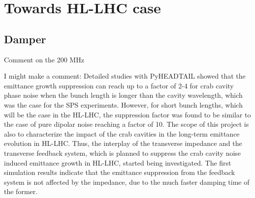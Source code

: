 \section{Towards HL-LHC case}
\subsection{Damper}
Comment on the 200 MHz

I might make a comment:
Detailed studies with PyHEADTAIL showed that the emittance growth suppression can reach up to a factor of 2-4 for crab cavity phase noise when the bunch length is longer than the cavity wavelength, which was the case for the SPS experiments. However, for short bunch lengths, which will be the case in the HL-LHC, the suppression factor was found to be similar to the case of pure dipolar noise reaching a factor of 10. The scope of this project is also to characterize the impact of the crab cavities in the long-term emittance evolution in HL-LHC. Thus, the interplay of the transverse impedance and the transverse feedback system, which is planned to suppress the crab cavity noise induced emittance growth in HL-LHC, started being investigated. The first simulation results indicate that the emittance suppression from the feedback system is not affected by the impedance, due to the much faster damping time of the former.


